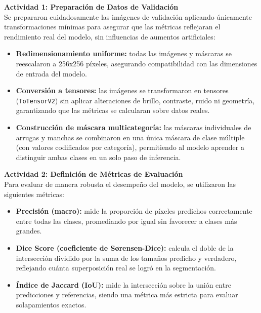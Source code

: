 \textbf{Actividad 1: Preparación de Datos de Validación} \\
Se prepararon cuidadosamente las imágenes de validación aplicando únicamente transformaciones mínimas para asegurar que las métricas reflejaran el rendimiento real del modelo, sin influencias de aumentos artificiales:
\begin{itemize}
  \item \textbf{Redimensionamiento uniforme:} todas las imágenes y máscaras se reescalaron a 256x256 píxeles, asegurando compatibilidad con las dimensiones de entrada del modelo.
  \item \textbf{Conversión a tensores:} las imágenes se transformaron en tensores (\texttt{ToTensorV2}) sin aplicar alteraciones de brillo, contraste, ruido ni geometría, garantizando que las métricas se calcularan sobre datos reales.
  \item \textbf{Construcción de máscara multicategoría:} las máscaras individuales de arrugas y manchas se combinaron en una única máscara de clase múltiple (con valores codificados por categoría), permitiendo al modelo aprender a distinguir ambas clases en un solo paso de inferencia.
\end{itemize}

\vspace{0.5cm}

\textbf{Actividad 2: Definición de Métricas de Evaluación} \\
Para evaluar de manera robusta el desempeño del modelo, se utilizaron las siguientes métricas:
\begin{itemize}
  \item \textbf{Precisión (macro):} mide la proporción de píxeles predichos correctamente entre todas las clases, promediando por igual sin favorecer a clases más grandes.
  \item \textbf{Dice Score (coeficiente de Sørensen-Dice):} calcula el doble de la intersección dividido por la suma de los tamaños predicho y verdadero, reflejando cuánta superposición real se logró en la segmentación.
  \item \textbf{Índice de Jaccard (IoU):} mide la intersección sobre la unión entre predicciones y referencias, siendo una métrica más estricta para evaluar solapamientos exactos.
\end{itemize}

\vspace{0.5cm}

